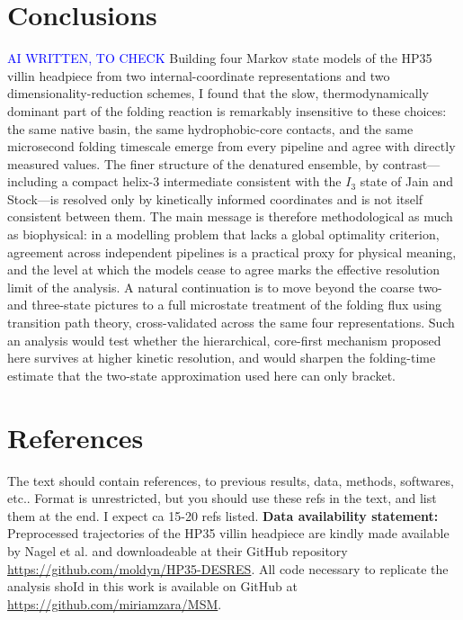 \documentclass[prl,twocolumn]{revtex4-1}
\begin{document}
\section{Conclusions}
\textcolor{blue}{AI WRITTEN, TO CHECK}
Building four Markov state models of the HP35 villin headpiece from two
internal-coordinate representations and two dimensionality-reduction
schemes, I found that the slow, thermodynamically dominant part of the
folding reaction is remarkably insensitive to these choices: the same
native basin, the same hydrophobic-core contacts, and the same
microsecond folding timescale emerge from every pipeline and agree with
directly measured values. The finer structure of the denatured
ensemble, by contrast---including a compact helix-3 intermediate
consistent with the $I_3$ state of Jain and Stock---is resolved only by
kinetically informed coordinates and is not itself consistent between
them. The main message is therefore methodological as much as
biophysical: in a modelling problem that lacks a global optimality
criterion, agreement across independent pipelines is a practical proxy
for physical meaning, and the level at which the models cease to agree
marks the effective resolution limit of the analysis. A natural
continuation is to move beyond the coarse two- and three-state pictures
to a full microstate treatment of the folding flux using transition path
theory, cross-validated across the same four representations. Such an
analysis would test whether the hierarchical, core-first mechanism
proposed here survives at higher kinetic resolution, and would sharpen
the folding-time estimate that the two-state approximation used here can
only bracket.

%
%
%
\section{References}
{ \color{blue}
The text should contain references, to previous results, data, methods, softwares, etc.. Format is unrestricted, but you should use these refs in the text, and list them at the end. I expect ca 15-20 refs listed.
}
\newline \noindent \textbf{Data availability statement:} Preprocessed trajectories of the HP35 villin headpiece are kindly made available by Nagel et al. and downloadeable at their GitHub repository \url{https://github.com/moldyn/HP35-DESRES}.
All code necessary to replicate the analysis shoId in this work is available on GitHub at \url{https://github.com/miriamzara/MSM}.
\end{document}
